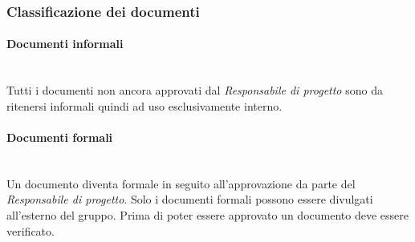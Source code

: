 \subsubsection{Classificazione dei documenti} \label{documenti}


\paragraph{Documenti informali}\mbox{}\\
Tutti i documenti non ancora approvati dal \textit{Responsabile di progetto} sono da ritenersi informali quindi ad uso esclusivamente interno.

\paragraph{Documenti formali}\mbox{}\\
Un documento diventa formale in seguito all'approvazione da parte del \textit{Responsabile di progetto}. Solo i documenti formali possono essere divulgati all'esterno del gruppo. Prima di poter essere approvato un documento deve essere verificato. 

